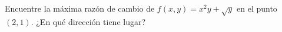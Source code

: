 \item Encuentre la máxima razón de cambio de $f(x, y) = x^2y + \sqrt{y}$ en el punto $(2, 1)$. ¿En qué dirección tiene lugar?

